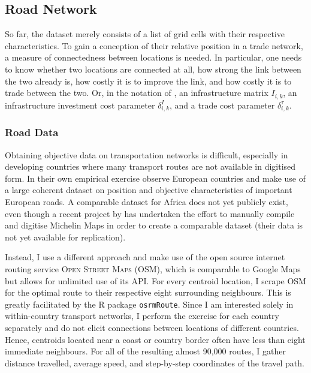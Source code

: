 \documentclass[11pt, oneside]{article}   	%
\begin{document}
\subsection{Road Network}
So far, the dataset merely consists of a list of grid cells with their respective characteristics. To gain a conception of their relative position in a trade network, a measure of connectedness between locations is needed. In particular, one needs to know whether two locations are connected at all, how strong the link between the two already is, how costly it is to improve the link, and how costly it is to trade between the two. Or, in the notation of \cite{fajgelbaum_optimal_2017}, an infrastructure matrix $I_{i,k}$, an infrastructure investment cost parameter $\delta_{i,k}^{I}$, and a trade cost parameter $\delta_{i,k}^{\tau}$.

\subsubsection{Road Data}
Obtaining objective data on transportation networks is difficult, especially in developing countries where many transport routes are not available in digitised form. In their own empirical exercise \citeauthor{fajgelbaum_optimal_2017} observe European countries and make use of a large coherent dataset on position and objective characteristics of important European roads. A comparable dataset for Africa does not yet publicly exist, even though a recent project by \cite{jedwab_average_2017} has undertaken the effort to manually compile and digitise Michelin Maps in order to create a comparable dataset (their data is not yet available for replication).

Instead, I use a different approach and make use of the open source internet routing service \textsc{Open Street Maps} (OSM), which is comparable to Google Maps but allows for unlimited use of its API. For every centroid location, I scrape OSM for the optimal route to their respective eight surrounding neighbours. This is greatly facilitated by the R package \texttt{osrmRoute}. Since I am interested solely in within-country transport networks, I perform the exercise for each country separately and do not elicit connections between locations of different countries. Hence, centroids located near a coast or country border often have less than eight immediate neighbours. For all of the resulting almost 90,000 routes, I gather distance travelled, average speed, and step-by-step coordinates of the travel path.
\end{document}

